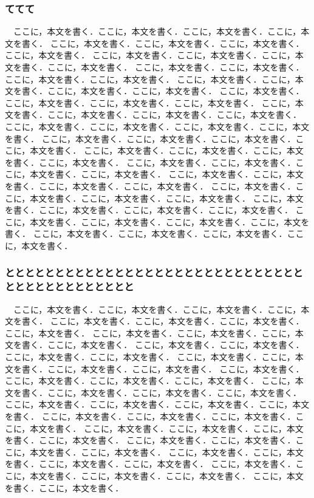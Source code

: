 \subsubsection{ててて}
　ここに，本文を書く．ここに，本文を書く．ここに，本文を書く．ここに，本文を書く．
ここに，本文を書く．ここに，本文を書く．ここに，本文を書く．ここに，本文を書く．
ここに，本文を書く．ここに，本文を書く．ここに，本文を書く．ここに，本文を書く．
ここに，本文を書く．ここに，本文を書く．ここに，本文を書く．ここに，本文を書く．
ここに，本文を書く．ここに，本文を書く．ここに，本文を書く．ここに，本文を書く．
ここに，本文を書く．ここに，本文を書く．ここに，本文を書く．ここに，本文を書く．
ここに，本文を書く．ここに，本文を書く．ここに，本文を書く．ここに，本文を書く．
ここに，本文を書く．ここに，本文を書く．ここに，本文を書く．ここに，本文を書く．
ここに，本文を書く．ここに，本文を書く．ここに，本文を書く．ここに，本文を書く．
ここに，本文を書く．ここに，本文を書く．ここに，本文を書く．ここに，本文を書く．
ここに，本文を書く．ここに，本文を書く．ここに，本文を書く．ここに，本文を書く．
ここに，本文を書く．ここに，本文を書く．ここに，本文を書く．ここに，本文を書く．
ここに，本文を書く．ここに，本文を書く．ここに，本文を書く．ここに，本文を書く．
ここに，本文を書く．ここに，本文を書く．ここに，本文を書く．ここに，本文を書く．
ここに，本文を書く．ここに，本文を書く．ここに，本文を書く．ここに，本文を書く．
ここに，本文を書く．ここに，本文を書く．ここに，本文を書く．ここに，本文を書く．

\subsubsection{ととととととととととととととととととととととととととととととととととととととととととと}
　ここに，本文を書く．ここに，本文を書く．ここに，本文を書く．ここに，本文を書く．
ここに，本文を書く．ここに，本文を書く．ここに，本文を書く．ここに，本文を書く．
ここに，本文を書く．ここに，本文を書く．ここに，本文を書く．ここに，本文を書く．
ここに，本文を書く．ここに，本文を書く．ここに，本文を書く．ここに，本文を書く．
ここに，本文を書く．ここに，本文を書く．ここに，本文を書く．ここに，本文を書く．
ここに，本文を書く．ここに，本文を書く．ここに，本文を書く．ここに，本文を書く．
ここに，本文を書く．ここに，本文を書く．ここに，本文を書く．ここに，本文を書く．
ここに，本文を書く．ここに，本文を書く．ここに，本文を書く．ここに，本文を書く．
ここに，本文を書く．ここに，本文を書く．ここに，本文を書く．ここに，本文を書く．
ここに，本文を書く．ここに，本文を書く．ここに，本文を書く．ここに，本文を書く．
ここに，本文を書く．ここに，本文を書く．ここに，本文を書く．ここに，本文を書く．
ここに，本文を書く．ここに，本文を書く．ここに，本文を書く．ここに，本文を書く．
ここに，本文を書く．ここに，本文を書く．ここに，本文を書く．ここに，本文を書く．
ここに，本文を書く．ここに，本文を書く．






